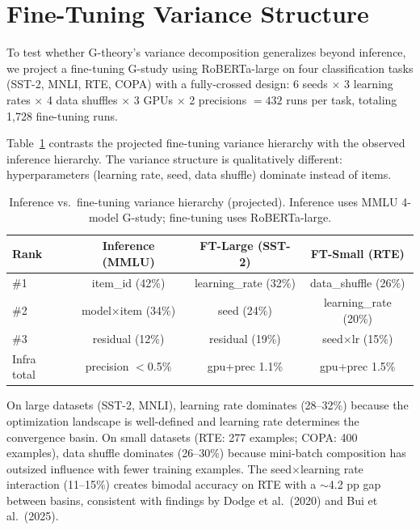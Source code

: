 \documentclass[11pt]{article}
\begin{document}
\section{Fine-Tuning Variance Structure}
\label{sec:finetune}

To test whether G-theory's variance decomposition generalizes beyond inference, we project a fine-tuning G-study using RoBERTa-large on four classification tasks (SST-2, MNLI, RTE, COPA) with a fully-crossed design: 6 seeds $\times$ 3 learning rates $\times$ 4 data shuffles $\times$ 3 GPUs $\times$ 2 precisions $= 432$ runs per task, totaling 1{,}728 fine-tuning runs.

Table~\ref{tab:finetune} contrasts the projected fine-tuning variance hierarchy with the observed inference hierarchy.
The variance structure is qualitatively different: hyperparameters (learning rate, seed, data shuffle) dominate instead of items.

\begin{table}[t]
\centering
\caption{Inference vs.\ fine-tuning variance hierarchy (projected). Inference uses MMLU 4-model G-study; fine-tuning uses RoBERTa-large.}
\label{tab:finetune}
\small
\begin{tabular}{@{}lccc@{}}
\toprule
Rank & Inference (MMLU) & FT-Large (SST-2) & FT-Small (RTE) \\
\midrule
\#1 & item\_id (42\%) & learning\_rate (32\%) & data\_shuffle (26\%) \\
\#2 & model$\times$item (34\%) & seed (24\%) & learning\_rate (20\%) \\
\#3 & residual (12\%) & residual (19\%) & seed$\times$lr (15\%) \\
\midrule
Infra total & precision $<$0.5\% & gpu+prec 1.1\% & gpu+prec 1.5\% \\
\bottomrule
\end{tabular}
\end{table}

On large datasets (SST-2, MNLI), learning rate dominates (28--32\%) because the optimization landscape is well-defined and learning rate determines the convergence basin.
On small datasets (RTE: 277 examples; COPA: 400 examples), data shuffle dominates (26--30\%) because mini-batch composition has outsized influence with fewer training examples.
The seed$\times$learning rate interaction (11--15\%) creates bimodal accuracy on RTE with a $\sim$4.2 pp gap between basins, consistent with findings by Dodge et al.\ (2020) and Bui et al.\ (2025).
\end{document}
